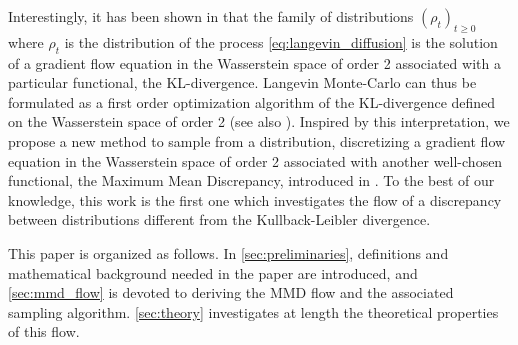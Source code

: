 Interestingly, it has been shown in \cite{jordan1998variational} that the family of distributions $(\rho_t)_{t\ge 0}$ where $\rho_t$ is the distribution of the process \eqref{eq:langevin_diffusion} is the solution of a gradient
flow equation in the Wasserstein space of order 2 associated with a particular functional, the KL-divergence. Langevin Monte-Carlo can thus be formulated as a first order optimization algorithm of the KL-divergence defined on the Wasserstein space of order 2 (see also \cite{durmus2018analysis,bernton2018langevin}). Inspired by this interpretation, we propose a new method to sample from a distribution, discretizing a gradient
flow equation in the Wasserstein space of order 2 associated with another well-chosen functional, the Maximum Mean Discrepancy, introduced in \cite{gretton2012kernel}. To the best of our knowledge, this work is the first one which investigates the flow of a discrepancy between distributions different from the Kullback-Leibler divergence. 


This paper is organized as follows. In \cref{sec:preliminaries}, definitions and mathematical background needed in the paper are introduced, and \cref{sec:mmd_flow} is devoted to deriving the MMD flow and the associated sampling algorithm.
\cref{sec:theory} investigates at length the theoretical properties of this flow. 